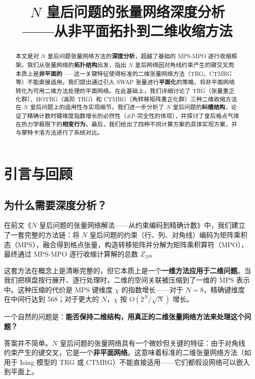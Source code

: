 \documentclass[12pt,a4paper]{ctexart}
\title{\textbf{$N$ 皇后问题的张量网络深度分析\\——从非平面拓扑到二维收缩方法}}
\author{}
\date{}
\begin{document}
\maketitle
\thispagestyle{empty}

\begin{abstract}
本文是对 $N$ 皇后问题张量网络方法的\textbf{深度分析}，超越了基础的 MPS-MPO 逐行收缩框架。我们从张量网络的\textbf{拓扑结构}出发，指出 $N$ 皇后网络因对角线约束产生的键交叉而本质上是\textbf{非平面的}——这一关键特征使得标准的二维张量网络方法（TRG、CTMRG 等）不能直接适用。我们提出通过引入 SWAP 张量进行\textbf{平面化}的策略，将非平面网络转化为可用二维方法处理的平面网络。在此基础上，我们详细讨论了 TRG（张量重正化群）、HOTRG（高阶 TRG）和 CTMRG（角转移矩阵重正化群）三种二维收缩方法在 $N$ 皇后问题上的适用性与实现细节。我们进一步分析了 $N$ 皇后问题的\textbf{纠缠结构}，论证了精确计数时键维度指数增长的必然性（\#P-完全性的体现），并探讨了皇后格点气体在热力学极限下的\textbf{相变行为}。最后，我们给出了四种不同计算方案的具体实现方案，并与蒙特卡洛方法进行了系统对比。
\end{abstract}

\tableofcontents
\newpage

\section{引言与回顾}

\subsection{为什么需要深度分析？}

在前文《$N$ 皇后问题的张量网络解法——从约束编码到精确计数》中，我们建立了一套完整的方法链：将 $N$ 皇后问题的约束（行、列、对角线）编码为矩阵乘积态（MPS），融合得到格点张量，构造转移矩阵并分解为矩阵乘积算符（MPO），最终通过 MPS-MPO 逐行收缩计算解的总数 $Z_N$。

这套方法在概念上是清晰完整的，但它本质上是一个\textbf{一维方法应用于二维问题}。当我们把棋盘按行展开、逐行处理时，二维的空间关联被压缩到了一维的 MPS 表示中。这种压缩的代价是 MPS 键维度 $\chi$ 的指数增长——对于 $N = 8$，精确键维度在中间行达到 568；对于更大的 $N$，$\chi$ 按 $O(2^N/\sqrt{N})$ 增长。

一个自然的问题是：\textbf{能否保持二维结构，用真正的二维张量网络方法来处理这个问题？}

答案并不简单。$N$ 皇后问题的张量网络具有一个微妙但关键的特征：由于对角线约束产生的键交叉，它是一个\textbf{非平面网络}。这意味着标准的二维张量网络方法（如用于 Ising 模型的 TRG 或 CTMRG）不能直接适用——它们都假设网络可以嵌入到平面上。
\end{document}
